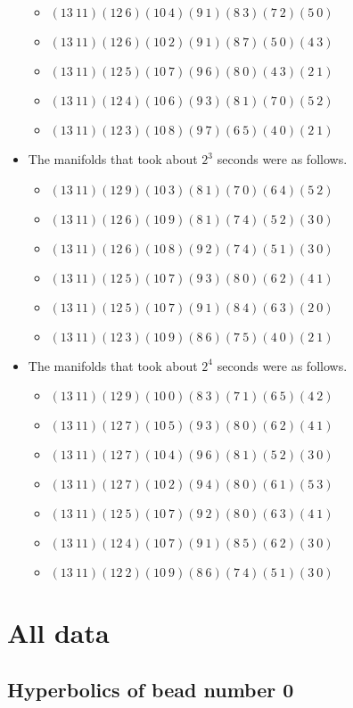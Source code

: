 \documentclass{article}
\begin{document}
\begin{itemize}
\begin{itemize}
\item $(13\ 11)(12\ 6)(10\ 4)(9\ 1)(8\ 3)(7\ 2)(5\ 0)$
\item $(13\ 11)(12\ 6)(10\ 2)(9\ 1)(8\ 7)(5\ 0)(4\ 3)$
\item $(13\ 11)(12\ 5)(10\ 7)(9\ 6)(8\ 0)(4\ 3)(2\ 1)$
\item $(13\ 11)(12\ 4)(10\ 6)(9\ 3)(8\ 1)(7\ 0)(5\ 2)$
\item $(13\ 11)(12\ 3)(10\ 8)(9\ 7)(6\ 5)(4\ 0)(2\ 1)$
\end{itemize}
\item The manifolds that took about $2^{3}$ seconds were as follows.
\begin{itemize}
\item $(13\ 11)(12\ 9)(10\ 3)(8\ 1)(7\ 0)(6\ 4)(5\ 2)$
\item $(13\ 11)(12\ 6)(10\ 9)(8\ 1)(7\ 4)(5\ 2)(3\ 0)$
\item $(13\ 11)(12\ 6)(10\ 8)(9\ 2)(7\ 4)(5\ 1)(3\ 0)$
\item $(13\ 11)(12\ 5)(10\ 7)(9\ 3)(8\ 0)(6\ 2)(4\ 1)$
\item $(13\ 11)(12\ 5)(10\ 7)(9\ 1)(8\ 4)(6\ 3)(2\ 0)$
\item $(13\ 11)(12\ 3)(10\ 9)(8\ 6)(7\ 5)(4\ 0)(2\ 1)$
\end{itemize}
\item The manifolds that took about $2^{4}$ seconds were as follows.
\begin{itemize}
\item $(13\ 11)(12\ 9)(10\ 0)(8\ 3)(7\ 1)(6\ 5)(4\ 2)$
\item $(13\ 11)(12\ 7)(10\ 5)(9\ 3)(8\ 0)(6\ 2)(4\ 1)$
\item $(13\ 11)(12\ 7)(10\ 4)(9\ 6)(8\ 1)(5\ 2)(3\ 0)$
\item $(13\ 11)(12\ 7)(10\ 2)(9\ 4)(8\ 0)(6\ 1)(5\ 3)$
\item $(13\ 11)(12\ 5)(10\ 7)(9\ 2)(8\ 0)(6\ 3)(4\ 1)$
\item $(13\ 11)(12\ 4)(10\ 7)(9\ 1)(8\ 5)(6\ 2)(3\ 0)$
\item $(13\ 11)(12\ 2)(10\ 9)(8\ 6)(7\ 4)(5\ 1)(3\ 0)$
\end{itemize}
\end{itemize}
\section{All data}
\subsection{Hyperbolics of bead number 0}
\end{document}
